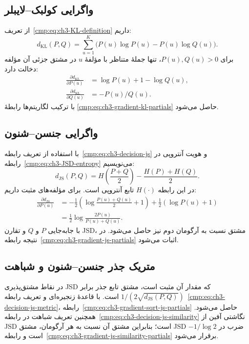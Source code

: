 \subsection{واگرایی کولبک--لایبلر}
\label{app:ch3-gradient-measures-kl}

از تعریف~\eqref{cmp:eq:ch3-KL-definition} داریم:
\[
d_{\mathrm{KL}}(P,Q)
=\sum_{u=1}^{K}\bigl(P(u)\log P(u)-P(u)\log Q(u)\bigr).
\]
برای $P(u),Q(u)>0$، تنها جملهٔ متناظر با
مؤلفهٔ $u$ در مشتق جزئی آن مؤلفه دخالت دارد:
\[
\begin{aligned}
\frac{\partial d_{\mathrm{KL}}}{\partial P(u)}
&=\log P(u)+1-\log Q(u),\\
\frac{\partial d_{\mathrm{KL}}}{\partial Q(u)}
&=-P(u)/Q(u).
\end{aligned}
\]
با ترکیب لگاریتم‌ها رابطهٔ
\eqref{cmp:eq:ch3-gradient-kl-partials} حاصل می‌شود.

\subsection{واگرایی جنسن--شنون}
\label{app:ch3-gradient-measures-js}

با استفاده از تعریف
رابطه~\eqref{cmp:eq:ch3-decision-js} و
هویت آنتروپی در رابطه~\eqref{cmp:eq:ch3-JSD-entropy}
می‌نویسیم:
\[
d_{\mathrm{JS}}(P,Q)
=H\!\left(\frac{P+Q}{2}\right)-\frac{H(P)+H(Q)}2 .
\]
در این رابطه $H(\cdot)$ تابع آنتروپی است.
برای مؤلفه‌های مثبت داریم:
\[
\begin{aligned}
\frac{\partial d_{\mathrm{JS}}}{\partial P(u)}
&=-\frac12\left(\log\frac{P(u)+Q(u)}2+1\right)
+\frac12(\log P(u)+1)\\
&=\frac12\log\frac{2P(u)}{P(u)+Q(u)}.
\end{aligned}
\]
با جابه‌جایی $P$ و $Q$ و تقارن JSD، مشتق
نسبت به آرگومان دوم نیز حاصل می‌شود. در نتیجه
رابطه~\eqref{cmp:eq:ch3-gradient-js-partials}
اثبات می‌شود.

\subsection{متریک جذر جنسن--شنون و شباهت}
\label{app:ch3-gradient-measures-sqrt}

در نقاط مشتق‌پذیری JSD که مقدار آن مثبت
است، مشتق تابع جذر برابر
$1/(2\sqrt{d_{\mathrm{JS}}(P,Q)})$ است.
با قاعدهٔ زنجیره‌ای و تعریف
رابطه~\eqref{cmp:eq:ch3-decision-js-metric}،
رابطه~\eqref{cmp:eq:ch3-gradient-sqrt-js-partials}
حاصل می‌شود. همچنین تعریف شباهت در
رابطه~\eqref{cmp:eq:ch3-decision-js-similarity}
نگاشتی آفین از JSD است؛ بنابراین مشتق
آن نسبت به هر آرگومان، مشتق JSD ضرب در
$-1/\log2$ است و
رابطه~\eqref{cmp:eq:ch3-gradient-js-similarity-partials}
برقرار می‌شود.

